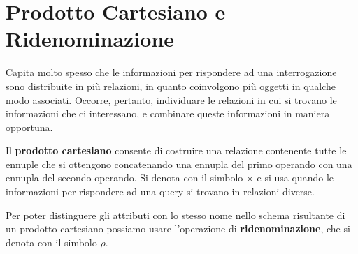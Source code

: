 \section{Prodotto Cartesiano e Ridenominazione}
Capita molto spesso che le informazioni per rispondere ad una interrogazione sono distribuite in più relazioni, in quanto coinvolgono più oggetti in qualche modo associati. Occorre, pertanto, individuare le relazioni in cui si trovano le informazioni che ci interessano, e combinare queste informazioni in maniera opportuna.

\begin{redbar}
    Il \textbf{prodotto cartesiano} consente di costruire una relazione contenente tutte le ennuple che si ottengono concatenando una ennupla del primo operando con una ennupla del secondo operando. Si denota con il simbolo $\times$ e si usa quando le informazioni per rispondere ad una query si trovano in relazioni diverse.
\end{redbar}

\begin{redbar}
    Per poter distinguere gli attributi con lo stesso nome nello schema risultante di un prodotto cartesiano possiamo usare l'operazione di \textbf{ridenominazione}, che si denota con il simbolo $\rho$.
\end{redbar}


